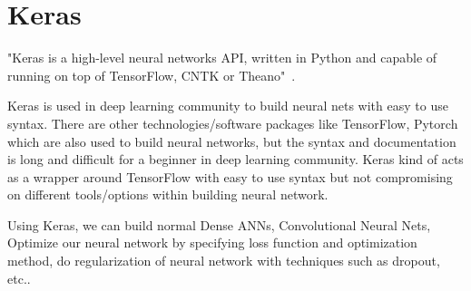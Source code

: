 \section{Keras} 

"Keras is a high-level neural networks API, written in Python and capable of
running on top of TensorFlow, CNTK or Theano"~\cite{hid-sp18-401-keras}.

Keras is used in deep learning community to build neural nets with easy to use
syntax. There are other technologies/software packages like TensorFlow, Pytorch
which are also used to build neural networks, but the syntax and documentation
is long and difficult for a beginner in deep learning community. Keras kind of
acts as a wrapper around TensorFlow with easy to use syntax but not compromising
on different tools/options within building neural network.

Using Keras, we can build normal Dense ANNs, Convolutional Neural Nets, Optimize
our neural network by specifying loss function and optimization method, do
regularization of neural network with techniques such as dropout, etc..




